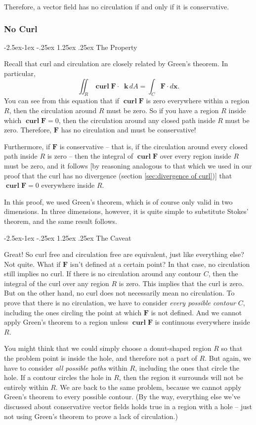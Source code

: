 \documentclass{myarticle}
\makeatletter
\newcommand\subsubsubsection{\@startsection{paragraph}{4}{\z@}%
            {-2.5ex\@plus -1ex \@minus -.25ex}%
            {1.25ex \@plus .25ex}%
            {\normalfont\normalsize\bfseries}}
\DeclareMathOperator{\curl}{\mathbf{curl}}
\renewcommand{\vec}[1]{\mathbf{#1}}
\newcommand{\unitvector}[1]{
  \mathop{}\!\vec{#1}
}
\newcommand{\kh}{\unitvector{k}}
\theoremstyle{nospace}
\newtheorem{old series theorem}{Theorem}
\newenvironment{series theorem}{\begin{mdframed}\begin{old series theorem}}{\end{old series theorem}\end{mdframed}}
\makeatother
\begin{document}
Therefore, a vector field has no circulation if and only if it is conservative.

\subsubsection{No Curl} \label{sec:no curl}

\subsubsubsection{The Property} \label{sec:no curl property}

Recall that curl and circulation are closely related by Green's theorem. In particular, \[ \iint_R \curl \vec{F} \cdot \kh \,dA = \int_C \vec{F} \cdot d\vec{x}. \] You can see from this equation that if $\curl \vec{F}$ is zero everywhere within a region $R$, then the circulation around $R$ must be zero. So if you have a region $R$ inside which $\curl \vec{F} = 0$, then the circulation around any closed path inside $R$ must be zero. Therefore, $\vec{F}$ has no circulation and must be conservative!

Furthermore, if $\vec{F}$ is conservative -- that is, if the circulation around every closed path inside $R$ is zero -- then the integral of $\curl \vec{F}$ over every region inside $R$ must be zero, and it follows [by reasoning analogous to that which we used in our proof that the curl has no divergence (section \ref{sec:divergence of curl})] that $\curl \vec{F} = 0$ everywhere inside $R$.

In this proof, we used Green's theorem, which is of course only valid in two dimensions. In three dimensions, however, it is quite simple to substitute Stokes' theorem, and the same result follows.

\subsubsubsection{The Caveat} \label{sec:no curl caveat}

Great! So curl free and circulation free are equivalent, just like everything else? Not quite. What if $\vec{F}$ isn't defined at a certain point? In that case, no circulation still implies no curl. If there is no circulation around any contour $C$, then the integral of the curl over any region $R$ is zero. This implies that the curl is zero. But on the other hand, no curl does not necessarily mean no circulation. To prove that there is no circulation, we have to consider \emph{every possible contour} $C$, including the ones circling the point at which $\vec{F}$ is not defined. And we cannot apply Green's theorem to a region unless $\curl \vec{F}$ is continuous everywhere inside $R$.

You might think that we could simply choose a donut-shaped region $R$ so that the problem point is inside the hole, and therefore not a part of $R$. But again, we have to consider \emph{all possible paths} within $R$, including the ones that circle the hole. If a contour circles the hole in $R$, then the region it surrounds will not be entirely within $R$. We are back to the same problem, because we cannot apply Green's theorem to every possible contour. (By the way, everything else we've discussed about conservative vector fields holds true in a region with a hole -- just not using Green's theorem to prove a lack of circulation.)
\end{document}
